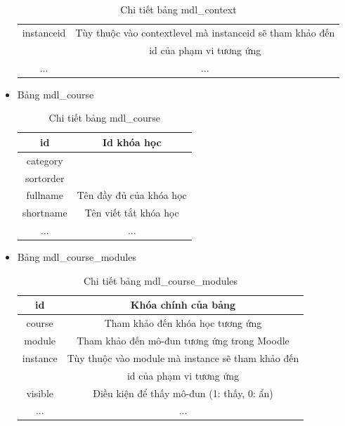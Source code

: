 \begin{itemize}
\begin{center}
\begin{table}[!htp]
\begin{tabular}{|c|c|}
				\hline 
				instanceid & Tùy thuộc vào contextlevel mà instanceid sẽ tham khảo đến \\ & id của phạm vi tương ứng \\ 
				\hline 
				... & ... \\
				\hline
			\end{tabular} 
			\caption{Chi tiết bảng mdl\_context}
			\label{bang6}
		\end{table}
	\end{center}
	\item Bảng mdl\_course
	\begin{center}
		\begin{table}[!htp]
			\centering
			\begin{tabular}{|c|c|}
				\hline 
				id & Id khóa học \\ 
				\hline 
				category &  \\ 
				\hline 
				sortorder &  \\ 
				\hline 
				fullname & Tên đầy đủ của khóa học \\ 
				\hline 
				shortname & Tên viết tắt khóa học \\ 
				\hline 
				... & ... \\
				\hline
			\end{tabular} 
			\caption{Chi tiết bảng mdl\_course}
			\label{bang7}
		\end{table}
	\end{center}
	\newpage
	\item Bảng mdl\_course\_modules
	\begin{center}
		\begin{table}[!htp]
			\centering
			\begin{tabular}{|c|c|}
				\hline 
				id & Khóa chính của bảng \\ 
				\hline 
				course & Tham khảo đến khóa học tương ứng \\ 
				\hline 
				module & Tham khảo đến mô-đun tương ứng trong Moodle \\ 
				\hline 
				instance & Tùy thuộc vào module mà instance sẽ tham khảo đến \\ & id của phạm vi tương ứng \\  
				\hline 
				visible & Điều kiện để thấy mô-đun (1: thấy, 0: ẩn) \\  
				\hline 
				... & ... \\ 
				\hline 
			\end{tabular}
			\caption{Chi tiết bảng mdl\_course\_modules}
			\label{bang8}
		\end{table}

\end{center}
\end{itemize}
